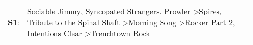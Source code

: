 \begin{supertabular}{p{0.03\textwidth}p{0.92\textwidth}}
 \textbf{S1}:  &  Sociable Jimmy\textsuperscript{}, \enspace Syncopated Strangers\textsuperscript{}, \enspace Prowler\textsuperscript{} \textgreater \enspace Spires\textsuperscript{}, \enspace Tribute to the Spinal Shaft\textsuperscript{} \textgreater \enspace Morning Song\textsuperscript{} \textgreater \enspace Rocker Part 2\textsuperscript{}, \enspace Intentions Clear\textsuperscript{} \textgreater \enspace Trenchtown Rock\textsuperscript{}  \enspace  \\
\end{supertabular}
